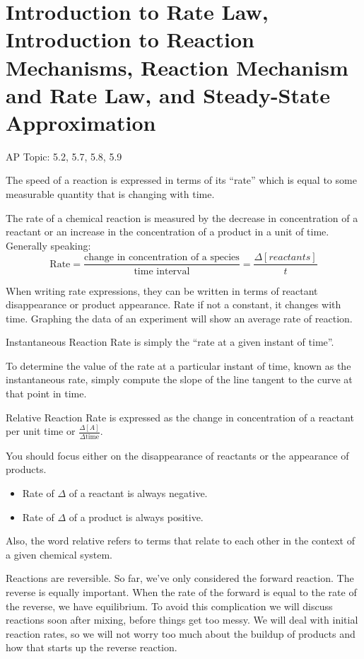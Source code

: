 \documentclass[../chem.tex]{subfiles}
\begin{document}
\section{Introduction to Rate Law, Introduction to Reaction Mechanisms, Reaction Mechanism and Rate Law, and Steady-State Approximation}
AP Topic: 5.2, 5.7, 5.8, 5.9

The speed of a reaction is expressed in terms of its ``rate'' which is equal to some measurable quantity that is changing with time.

The rate of a chemical reaction is measured by the decrease in concentration of a reactant or an increase in the concentration of a product in a unit of time.
Generally speaking:
\[\text{Rate}=\frac{\text{change in concentration of a species}}{\text{time interval}}=\frac{\Delta[reactants]}{t}\]

When writing rate expressions, they can be written in terms of reactant disappearance or product appearance. Rate if not a constant, it changes with time.
Graphing the data of an experiment will show an average rate of reaction.

Instantaneous Reaction Rate is simply the ``rate at a given instant of time''. 

To determine the value of the rate at a particular instant of time, known as the instantaneous rate, simply compute the slope of the line 
tangent to the curve at that point in time.

Relative Reaction Rate is expressed as the change in concentration of a reactant per unit time or $\frac{\Delta [A]}{\Delta \text{time}}$.

You should focus either on the disappearance of reactants or the appearance of products.
\begin{itemize}
    \item Rate of $\Delta$ of a reactant is always negative.
    \item Rate of $\Delta$ of a product is always positive.
\end{itemize}

Also, the word relative refers to terms that relate to each other in the context of a given chemical system.

Reactions are reversible. So far, we've only considered the forward reaction. The reverse is equally important. When the rate of the forward is equal to the 
rate of the reverse, we have equilibrium. To avoid this complication we will discuss reactions soon after mixing, before things get too messy. 
We will deal with initial reaction rates, so we will not worry too much about the buildup of products and how that starts up the reverse reaction.
\end{document}
